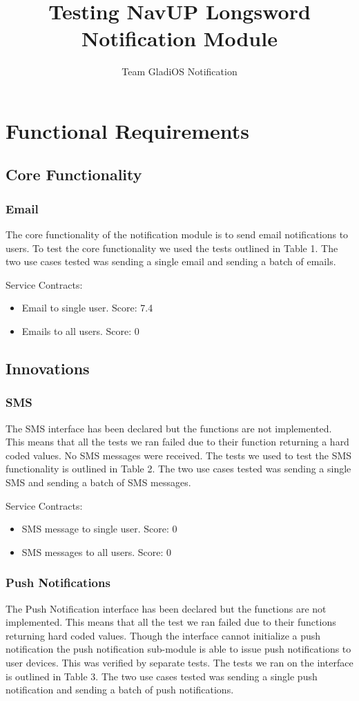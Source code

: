 \documentclass[11pt]{article}
\author{Team GladiOS Notification}
\title{Testing NavUP Longsword Notification Module}
\begin{document}
	\setlength{\parskip}{6pt}
	
	
	
	\tableofcontents
	
	\newpage
	
	\section{Functional Requirements}
	\subsection{Core Functionality}
	\subsubsection{Email}
	The core functionality of the notification module is to send email notifications to users. To test the core functionality we used the tests outlined in Table 1.
	The two use cases tested was sending a single email and sending a batch of emails.
	
	Service Contracts:
	\begin{itemize}
      \item Email to single user. Score: 7.4
      \item Emails to all users. Score: 0
    \end{itemize}
	\subsection{Innovations}
	\subsubsection{SMS}
	The SMS interface has been declared but the functions are not implemented. This means that all the tests we ran failed due to their function returning a hard coded values. No SMS messages were received. The tests we used to test the SMS functionality is outlined in Table 2. The two use cases tested was sending a single SMS and sending a batch of SMS messages.
	
	Service Contracts:
	\begin{itemize}
      \item SMS message to single user. Score: 0
      \item SMS messages to all users. Score: 0
    \end{itemize}
	\subsubsection{Push Notifications}
	The Push Notification interface has been declared but the functions are not implemented. This means that all the test we ran failed due to their functions returning hard coded values. Though the interface cannot initialize a push notification the push notification sub-module is able to issue push notifications to user devices. This was verified by separate tests. The tests we ran on the interface is outlined in Table 3. The two use cases tested was sending a single push notification and sending a batch of push notifications.
	
\end{document}
